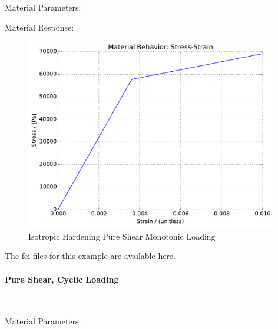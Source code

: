 \documentclass[fleqn,11pt]{article}
\begin{document}
Material Parameters:


Material Response:
\begin{figure}[H]
\begin{center}
\includegraphics[width=11cm]{../fei_examples/elastoplastic_isotropic_hardening/1pure_shear_mono_loading/result.pdf}
\caption{
\label{Isotropic Hardening Pure Shear Monotonic Loadin}
Isotropic Hardening Pure Shear Monotonic Loading}
\end{center}
\end{figure}

The fei files for this example are available \href{https://github.com/yuan-energy/education_examples/tree/master/fei_examples/isotropic_hardening_pure_shear/1pure_shear_mono_loading}{here}.

\newpage
\paragraph{Pure Shear, Cyclic Loading} ~

Material Parameters:

\end{document}

